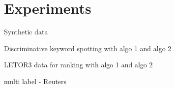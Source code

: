 

\section{Experiments}

Synthetic data

Discriminative keyword spotting with algo 1 and algo 2

LETOR3 data for ranking with algo 1 and algo 2

multi label - Reuters
